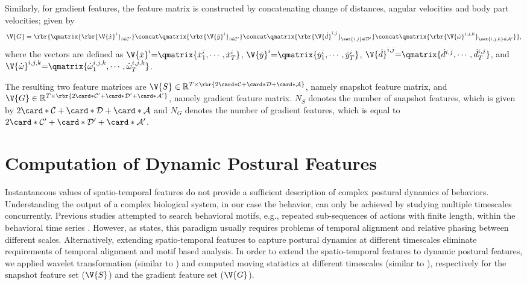 Similarly, for gradient features, the feature matrix is constructed by concatenating change of distances, angular velocities and body part velocities; given by
\begin{equation}
	\V{G} = \rbr{\qmatrix{\rbr{\V{\dot{x}}^i}_{i \in \mathcal{C}^{\prime}}} \concat \qmatrix{\rbr{\V{\dot{y}}^i}_{i \in \mathcal{C}^{\prime}}} \concat \qmatrix{\rbr{\V{\dot{d}}^{i,j}}_{\set{i,j} \in \mathcal{D}^{\prime}}} \concat \qmatrix{\rbr{\V{\dot{\omega}}^{i,j,k}}_{\set{i,j,k} \in \mathcal{A}^{\prime}}}},
\end{equation}
where the vectors are defined as $\V{\dot{x}}^{i}{=}\qmatrix{\dot{x}^{i}_1, \cdots, \dot{x}^{i}_T}$, $\V{\dot{y}}^{i}{=}\qmatrix{\dot{y}^{i}_1, \cdots, \dot{y}^{i}_T}$,   $\V{\dot{d}}^{i,j}{=}\qmatrix{\dot{d}^{i,j}, \cdots, \dot{d}^{i,j}_T}$, and $\V{\dot{\omega}}^{i,j,k}{=}\qmatrix{\dot{\omega}_1^{i,j,k}, \cdots, \dot{\omega}^{i,j,k}_T}$.

The resulting two feature matrices are $\V{S} \in \mathbb{R}^{T \times \rbr{2\card*{\mathcal{C}}+\card*{\mathcal{D}}+\card*{\mathcal{A}}}}$, namely snapshot feature matrix, and $\V{G} \in \mathbb{R}^{T \times \rbr{2\card*{\mathcal{C}^{\prime}}+\card*{\mathcal{D}^{\prime}}+\card*{\mathcal{A}^{\prime}}}}$, namely gradient feature matrix. $N_S$ denotes the number of snapshot features, which is given by $2\card*{\mathcal{C}}+\card*{\mathcal{D}}+\card*{\mathcal{A}}$ and $N_G$ denotes the number of gradient features, which is equal to $2\card*{\mathcal{C}^{\prime}}+\card*{\mathcal{D}^{\prime}}+\card*{\mathcal{A}^{\prime}}$.

\section{Computation of Dynamic Postural Features}\label{section:dynamic-postural-features}
Instantaneous values of spatio-temporal features do not provide a sufficient description of complex postural dynamics of behaviors.
Understanding the output of a complex biological system, in our case  the behavior, can only be achieved by studying multiple timescales concurrently.
Previous studies attempted to search behavioral motifs, e.g., repeated sub-sequences of actions with finite length, within the behavioral time series \citep{ye_time_2011, brown_dictionary_2013}.
However, as \citet{berman_mapping_2014} states, this paradigm usually requires problems of temporal alignment and relative phasing between different scales.
Alternatively, extending spatio-temporal features to capture postural dynamics at different timescales eliminate requirements of temporal alignment and motif based analysis.
In order to extend the spatio-temporal features to dynamic postural features, we applied wavelet transformation (similar to \citet{berman_mapping_2014}) and computed moving statistics at different timescales (similar to \citet{kabra_jaaba_2013}), respectively for the snapshot feature set ($\V{S}$) and the gradient feature set ($\V{G}$).

